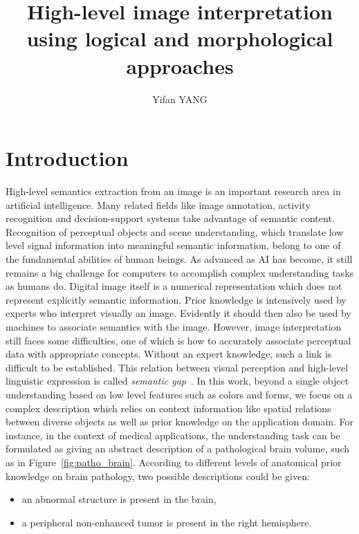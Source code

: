 \documentclass{article}
\title{High-level image interpretation using logical and morphological approaches}
\author{Yifan YANG}
\begin{document}
\maketitle
\section{Introduction}
 High-level semantics extraction from an image is an important research area  in artificial intelligence.
 Many related fields like image annotation, activity recognition and  decision-support systems take advantage of semantic content.
 Recognition of perceptual objects and scene understanding, which translate low level signal information into meaningful semantic information, belong to one of the fundamental abilities of human beings.
 As advanced as AI has become, it still remains a big challenge for computers to accomplish complex understanding tasks as humans do.
 Digital image itself is a numerical representation which does not represent explicitly semantic information. 
 Prior knowledge is intensively used by experts who interpret visually an image. Evidently it should then also be used by machines to associate semantics with the image.  
However, image interpretation still faces some difficulties, one of which is how to accurately associate perceptual data with appropriate concepts. Without an expert knowledge,
such a link is difficult to be established. This relation between visual perception and high-level linguistic expression is called \textit{semantic gap}~\cite{hudelot2008spatial}.
 In this work, beyond a single object understanding based on low level features such as colors and forms, we focus on a complex description which relies on context information like spatial relations
 between diverse objects as well as prior knowledge on the application domain. 
 For instance, in the context of medical applications, the understanding task can be formulated as giving an abstract description of a pathological brain volume, such as in Figure~\ref{fig:patho_brain}. 
  According to different levels of anatomical prior knowledge on brain pathology, two possible descriptions could be given:
 \begin{itemize}
  \item an abnormal structure is present in the brain,
  \item a peripheral non-enhanced tumor is present in the right hemisphere.
 \end{itemize}
\end{document}

